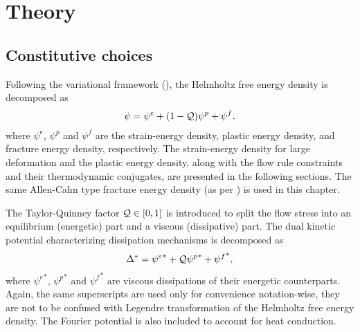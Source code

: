 \section{Theory}
\label{section: Chapter5/theory}

\subsection{Constitutive choices}

Following the variational framework (), the Helmholtz free energy density is decomposed as
\begin{align}
  \psi = \psi^e + (1-\mathcal{Q}) \psi^p + \psi^f, \label{eq: chapter 5 helmholtz}
\end{align}
where $\psi^e$, $\psi^p$ and $\psi^f$ are the strain-energy density, plastic energy density, and fracture energy density, respectively. The strain-energy density for large deformation and the plastic energy density, along with the flow rule constraints and their thermodynamic conjugates, are presented in the following sections. The same Allen-Cahn type fracture energy density (as per ) is used in this chapter.

The Taylor-Quinney factor $\mathcal{Q} \in [0, 1]$ is introduced to split the flow stress into an equilibrium (energetic) part and a viscous (dissipative) part. The dual kinetic potential characterizing dissipation mechanisms is decomposed as
\begin{align}
  \Delta^* = {\psi^e}^* + \mathcal{Q} {\psi^p}^* + {\psi^f}^*, \label{eq: chapter 5 dual kinetic potential}
\end{align}
where ${\psi^e}^*$, ${\psi^p}^*$ and ${\psi^f}^*$ are viscous dissipations of their energetic counterparts. Again, the same superscripts are used only for convenience notation-wise, they are not to be confused with Legendre transformation of the Helmholtz free energy density. The Fourier potential is also included to account for heat conduction.

